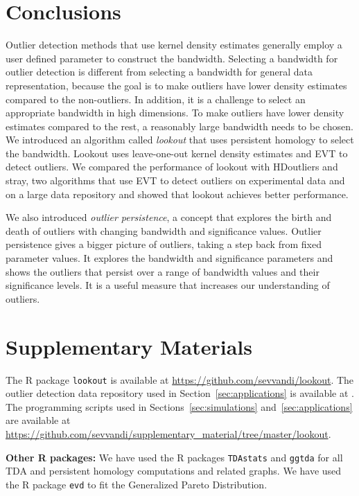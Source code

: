 \documentclass[letter,12pt]{article}
\begin{document}
\section{Conclusions}\label{sec:conclusions}
Outlier detection methods that use kernel density estimates generally employ a user defined parameter to construct the bandwidth. Selecting a bandwidth for outlier detection is different from selecting a bandwidth for general data representation, because the goal is to make outliers have lower density estimates compared to the non-outliers. In addition, it is a challenge to select an appropriate bandwidth in high dimensions. To make outliers have lower density estimates compared to the rest, a reasonably large bandwidth needs to be chosen. We introduced an algorithm called \textit{lookout} that uses  persistent homology to select the bandwidth. Lookout uses leave-one-out kernel density estimates and EVT to detect outliers. We compared the performance of lookout with HDoutliers and stray, two algorithms that use EVT to detect outliers on experimental data and  on a large data repository and showed that lookout achieves better performance. 


We also introduced \textit{outlier persistence}, a concept that explores the birth and death of outliers with changing bandwidth and significance values.  Outlier persistence gives a bigger picture of outliers, taking a step back from fixed parameter values. It explores the bandwidth and significance parameters and shows the outliers that persist over a range of bandwidth values and their significance levels. It is a useful measure that increases our understanding of outliers.  %



\section{Supplementary Materials}\label{sec:suppmat}
The R package \texttt{lookout} is available at  \url{https://github.com/sevvandi/lookout}. 
The outlier detection data repository used in Section~\ref{sec:applications} is available at \cite{datasets}. %
The programming scripts used in Sections~\ref{sec:simulations} and~\ref{sec:applications}  are available at \\ \url{https://github.com/sevvandi/supplementary_material/tree/master/lookout}. 

\textbf{Other R packages:} We have used the R packages \texttt{TDAstats} \citep{tdastatsR} and \texttt{ggtda} \citep{ggdta} for all TDA and persistent homology computations and related graphs. We have used the R package \texttt{evd} \citep{evdR} to fit the Generalized Pareto Distribution. 

 
\end{document}
